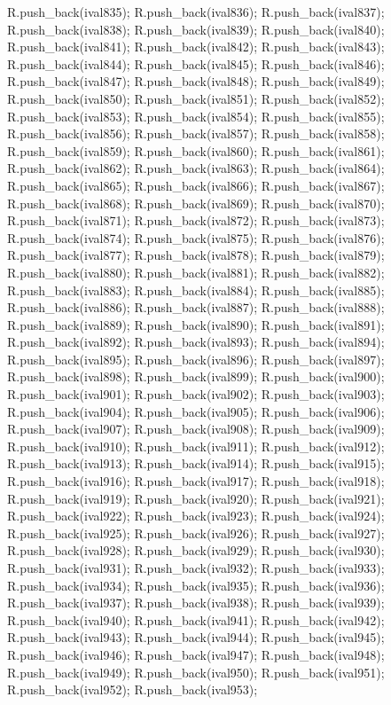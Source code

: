 \begin{DoxyCode}
{R.push_back(ival835);
R.push_back(ival836);
R.push_back(ival837);
R.push_back(ival838);
R.push_back(ival839);
R.push_back(ival840);
R.push_back(ival841);
R.push_back(ival842);
R.push_back(ival843);
R.push_back(ival844);
R.push_back(ival845);
R.push_back(ival846);
R.push_back(ival847);
R.push_back(ival848);
R.push_back(ival849);
R.push_back(ival850);
R.push_back(ival851);
R.push_back(ival852);
R.push_back(ival853);
R.push_back(ival854);
R.push_back(ival855);
R.push_back(ival856);
R.push_back(ival857);
R.push_back(ival858);
R.push_back(ival859);
R.push_back(ival860);
R.push_back(ival861);
R.push_back(ival862);
R.push_back(ival863);
R.push_back(ival864);
R.push_back(ival865);
R.push_back(ival866);
R.push_back(ival867);
R.push_back(ival868);
R.push_back(ival869);
R.push_back(ival870);
R.push_back(ival871);
R.push_back(ival872);
R.push_back(ival873);
R.push_back(ival874);
R.push_back(ival875);
R.push_back(ival876);
R.push_back(ival877);
R.push_back(ival878);
R.push_back(ival879);
R.push_back(ival880);
R.push_back(ival881);
R.push_back(ival882);
R.push_back(ival883);
R.push_back(ival884);
R.push_back(ival885);
R.push_back(ival886);
R.push_back(ival887);
R.push_back(ival888);
R.push_back(ival889);
R.push_back(ival890);
R.push_back(ival891);
R.push_back(ival892);
R.push_back(ival893);
R.push_back(ival894);
R.push_back(ival895);
R.push_back(ival896);
R.push_back(ival897);
R.push_back(ival898);
R.push_back(ival899);
R.push_back(ival900);
R.push_back(ival901);
R.push_back(ival902);
R.push_back(ival903);
R.push_back(ival904);
R.push_back(ival905);
R.push_back(ival906);
R.push_back(ival907);
R.push_back(ival908);
R.push_back(ival909);
R.push_back(ival910);
R.push_back(ival911);
R.push_back(ival912);
R.push_back(ival913);
R.push_back(ival914);
R.push_back(ival915);
R.push_back(ival916);
R.push_back(ival917);
R.push_back(ival918);
R.push_back(ival919);
R.push_back(ival920);
R.push_back(ival921);
R.push_back(ival922);
R.push_back(ival923);
R.push_back(ival924);
R.push_back(ival925);
R.push_back(ival926);
R.push_back(ival927);
R.push_back(ival928);
R.push_back(ival929);
R.push_back(ival930);
R.push_back(ival931);
R.push_back(ival932);
R.push_back(ival933);
R.push_back(ival934);
R.push_back(ival935);
R.push_back(ival936);
R.push_back(ival937);
R.push_back(ival938);
R.push_back(ival939);
R.push_back(ival940);
R.push_back(ival941);
R.push_back(ival942);
R.push_back(ival943);
R.push_back(ival944);
R.push_back(ival945);
R.push_back(ival946);
R.push_back(ival947);
R.push_back(ival948);
R.push_back(ival949);
R.push_back(ival950);
R.push_back(ival951);
R.push_back(ival952);
R.push_back(ival953);
}
\end{DoxyCode}
